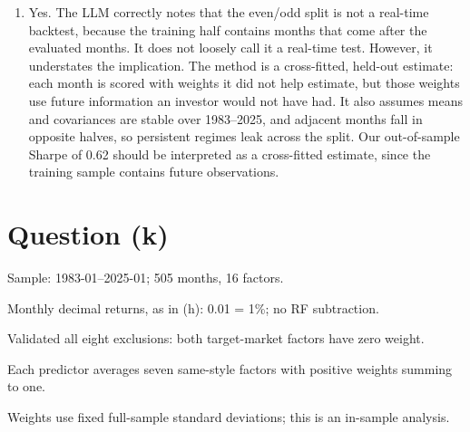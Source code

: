 \documentclass[11pt,letterpaper]{article}
\providecommand{\tightlist}{\setlength{\itemsep}{0pt}\setlength{\parskip}{0pt}}
\begin{document}
\begin{enumerate}
\def\labelenumi{(\roman{enumi})}
\setcounter{enumi}{3}
\tightlist
\item
  Yes. The LLM correctly notes that the even/odd split is not a real-time backtest, because the training half contains months that come after the evaluated months. It does not loosely call it a real-time test. However, it understates the implication. The method is a cross-fitted, held-out estimate: each month is scored with weights it did not help estimate, but those weights use future information an investor would not have had. It also assumes means and covariances are stable over 1983--2025, and adjacent months fall in opposite halves, so persistent regimes leak across the split. Our out-of-sample Sharpe of 0.62 should be interpreted as a cross-fitted estimate, since the training sample contains future observations.
\end{enumerate}


\clearpage
\section*{Question (k)}

Sample: 1983-01--2025-01; 505 months, 16 factors.

Monthly decimal returns, as in (h): 0.01 = 1\%; no RF subtraction.


Validated all eight exclusions: both target-market factors have zero weight.

Each predictor averages seven same-style factors with positive weights summing to one.

Weights use fixed full-sample standard deviations; this is an in-sample analysis.
\end{document}
